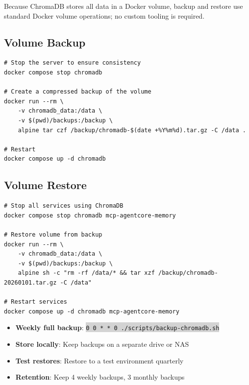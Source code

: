 \documentclass[11pt,letterpaper]{article}
\newcommand{\code}[1]{\texttt{\small\colorbox{lightgray}{#1}}}
\begin{document}
\begin{infobox}
Because ChromaDB stores all data in a Docker volume, backup and restore use standard Docker volume operations; no custom tooling is required.
\end{infobox}

\subsection{Volume Backup}

\begin{lstlisting}[caption={Backup ChromaDB Docker volume}, language={}]
# Stop the server to ensure consistency
docker compose stop chromadb

# Create a compressed backup of the volume
docker run --rm \
    -v chromadb_data:/data \
    -v $(pwd)/backups:/backup \
    alpine tar czf /backup/chromadb-$(date +%Y%m%d).tar.gz -C /data .

# Restart
docker compose up -d chromadb
\end{lstlisting}

\subsection{Volume Restore}

\begin{lstlisting}[caption={Restore ChromaDB from backup}, language={}]
# Stop all services using ChromaDB
docker compose stop chromadb mcp-agentcore-memory

# Restore volume from backup
docker run --rm \
    -v chromadb_data:/data \
    -v $(pwd)/backups:/backup \
    alpine sh -c "rm -rf /data/* && tar xzf /backup/chromadb-20260101.tar.gz -C /data"

# Restart services
docker compose up -d chromadb mcp-agentcore-memory
\end{lstlisting}

\begin{infobox}[Backup Schedule]
\begin{itemize}
  \item \textbf{Weekly full backup}: \code{0 0 * * 0 ./scripts/backup-chromadb.sh}
  \item \textbf{Store locally}: Keep backups on a separate drive or NAS
  \item \textbf{Test restores}: Restore to a test environment quarterly
  \item \textbf{Retention}: Keep 4 weekly backups, 3 monthly backups
\end{itemize}
\end{infobox}
\end{document}
